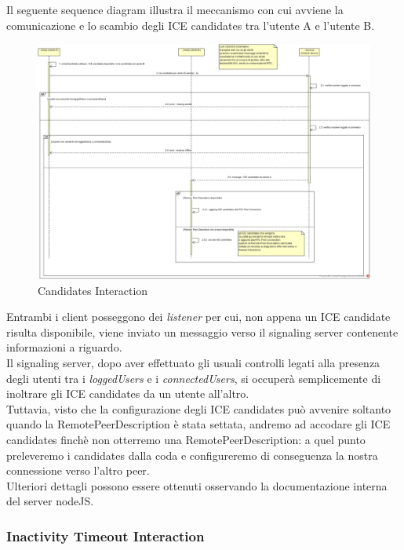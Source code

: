 Il seguente sequence diagram illustra il meccanismo con cui avviene la comunicazione e lo scambio degli ICE candidates tra l'utente A e l'utente B.\\

\begin{figure}[H]
	\centering
	\includegraphics[scale = .6]{img/sequence_candidates.png}
	\caption{Candidates Interaction}
	\label{gfx:candidatesinteraction}
\end{figure}

Entrambi i client posseggono dei \textit{listener} per cui, non appena un ICE candidate risulta disponibile, viene inviato un messaggio verso il signaling server contenente informazioni a riguardo.\\
Il signaling server, dopo aver effettuato gli usuali controlli legati alla presenza degli utenti tra i \textit{loggedUsers} e i \textit{connectedUsers}, si occuperà semplicemente di inoltrare gli ICE candidates da un utente all'altro.\\
Tuttavia, visto che la configurazione degli ICE candidates può avvenire soltanto quando la RemotePeerDescription è stata settata, andremo ad accodare gli ICE candidates finchè non otterremo una RemotePeerDescription: a quel punto preleveremo i candidates dalla coda e configureremo di conseguenza la nostra connessione verso l'altro peer.\\
Ulteriori dettagli possono essere ottenuti osservando la documentazione interna del server nodeJS.\\

\subsubsection{Inactivity Timeout Interaction}

